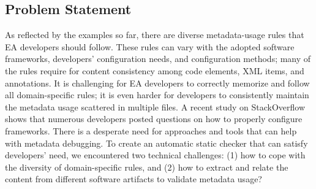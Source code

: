 \vspace{-0.5em}
\subsection{Problem Statement}
\label{ss:problem}

As reflected by the examples so far, there are diverse metadata-usage rules that EA developers should follow. These rules can vary with the adopted software frameworks, developers' configuration needs, and configuration methods; many of the rules require for content consistency among code elements, XML items, and annotations.
 It is challenging for EA developers to correctly memorize and follow all domain-specific rules; it is even harder for developers to consistently maintain the metadata usage scattered in multiple files. A recent study on StackOverflow~\cite{meng2018secure} shows that numerous developers posted questions on how to properly configure frameworks.
There is a desperate need for approaches and tools that can help with metadata debugging. 
To create an automatic static checker that can satisfy developers' need, we encountered two technical challenges: (1) how to cope with the diversity of domain-specific rules, and (2) how to extract and relate the content from different software artifacts to validate metadata usage?

\begin{comment}
\begin{itemize}
\item How can we cope with the diversity of domain-specific rules?
\item How can we extract and relate the content from different software artifacts to validate metadata usage?
\end{itemize}
\end{comment}
